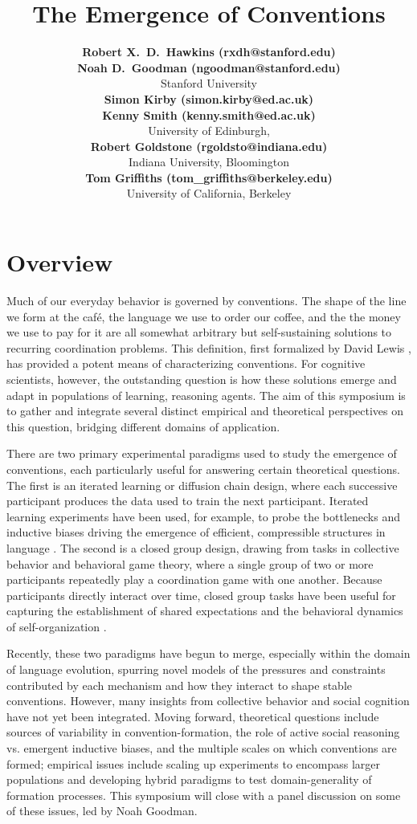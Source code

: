 \documentclass[10pt,letterpaper]{article}
\title{The Emergence of Conventions}
\author{
{\large \bf Robert X.~D.~Hawkins (rxdh@stanford.edu)} \\ 
{\large \bf Noah D.~Goodman (ngoodman@stanford.edu)}\\
  Stanford University \\
{\large \bf Simon Kirby (simon.kirby@ed.ac.uk)} \\
{\large \bf Kenny Smith (kenny.smith@ed.ac.uk)} \\
  University of Edinburgh, \\
{\large \bf Robert Goldstone (rgoldsto@indiana.edu)}\\
  Indiana University, Bloomington\\  
{\large \bf Tom Griffiths (tom\_griffiths@berkeley.edu)}\\
University of California, Berkeley}
\begin{document}
\maketitle

\section{Overview}

Much of our everyday behavior is governed by conventions. The shape of the line we form at the caf\'e, the language we use to order our coffee, and the the money we use to pay for it are all somewhat arbitrary but self-sustaining solutions to recurring coordination problems. This definition, first formalized by David Lewis \citeyear{Lewis69_Convention}, has provided a potent means of characterizing conventions. For cognitive scientists, however, the outstanding question is how these solutions emerge and adapt in populations of learning, reasoning agents. The aim of this symposium is to gather and integrate several distinct empirical and theoretical perspectives on this question, bridging different domains of application.

There are two primary experimental paradigms used to study the emergence of conventions, each particularly useful for answering certain theoretical questions. The first is an iterated learning or diffusion chain design, where each successive participant produces the data used to train the next participant. Iterated learning experiments have been used, for example, to probe the bottlenecks and inductive biases driving the emergence of efficient, compressible structures in language \cite{KirbyCornishSmith08_PNAS, GriffithsKalish07_LanguageEvolution}. The second is a closed group design, drawing from tasks in collective behavior and behavioral game theory, where a single group of two or more participants repeatedly play a coordination game with one another. Because participants directly interact over time, closed group tasks have been useful for capturing the establishment of shared expectations and the behavioral dynamics of self-organization \cite{GoldstoneGureckis09_Collective_Behavior_Review, CentolaBaronchelli15_ConventionEmergence}.

Recently, these two paradigms have begun to merge, especially within the domain of language evolution, spurring novel models of the pressures and constraints contributed by each mechanism and how they interact to shape stable conventions. However, many insights from collective behavior and social cognition have not yet been integrated. Moving forward, theoretical questions include sources of variability in convention-formation, the role of active social reasoning vs. emergent inductive biases, and the multiple scales on which conventions are formed; empirical issues include scaling up experiments to encompass larger populations and developing hybrid paradigms to test domain-generality of formation processes. This symposium will close with a panel discussion on some of these issues, led by Noah Goodman.
\end{document}

